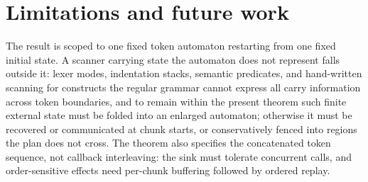 \documentclass[11pt,a4paper]{article}
\theoremstyle{definition}
\theoremstyle{plain}
\begin{document}
\section{Limitations and future work}

The result is scoped to one fixed token automaton restarting from one fixed initial state. A scanner carrying state
the automaton does not represent falls outside it: lexer modes, indentation stacks, semantic predicates, and
hand-written scanning for constructs the regular grammar cannot express all carry information across token boundaries,
and to remain within the present theorem such finite external state must be folded into an enlarged automaton;
otherwise it must be recovered or communicated at chunk starts, or conservatively fenced into regions the plan
does not cross. The
theorem also specifies the concatenated token sequence, not callback interleaving: the sink must tolerate
concurrent calls, and order-sensitive effects need per-chunk buffering followed by ordered replay.
\end{document}
